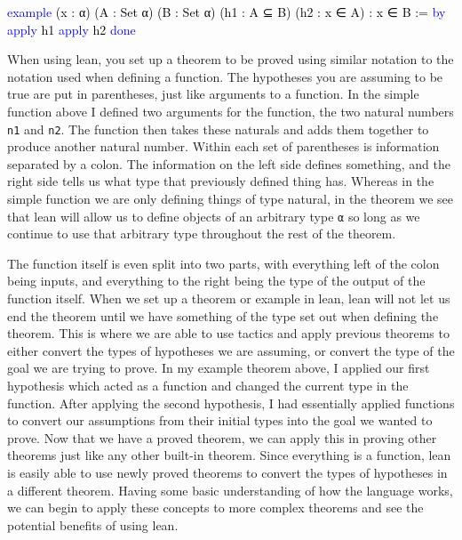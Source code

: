 \documentclass[
  letterpaper,
]{scrreprt}
\newenvironment{Shaded}{\begin{snugshade}}{\end{snugshade}}
\newcommand{\KeywordTok}[1]{\textcolor[rgb]{0.00,0.23,0.31}{#1}}
\newcommand{\NormalTok}[1]{\textcolor[rgb]{0.00,0.23,0.31}{#1}}
\renewcommand{\NormalTok}[1]{\textcolor[HTML]{000000}{#1}}
\renewcommand{\KeywordTok}[1]{\textcolor[HTML]{0000FF}{#1}}
\theoremstyle{remark}
\begin{document}
\begin{Shaded}
\begin{Highlighting}[]
\KeywordTok{example}\NormalTok{ (x : α) (A : Set α) (B : Set α) (h1 : A ⊆ B) }
\NormalTok{    (h2 : x ∈ A) : x ∈ B := }\KeywordTok{by}
  \KeywordTok{apply}\NormalTok{ h1}
  \KeywordTok{apply}\NormalTok{ h2}
  \KeywordTok{done}
\end{Highlighting}
\end{Shaded}

When using lean, you set up a theorem to be proved using similar
notation to the notation used when defining a function. The hypotheses
you are assuming to be true are put in parentheses, just like arguments
to a function. In the simple function above I defined two arguments for
the function, the two natural numbers \texttt{n1} and \texttt{n2}. The
function then takes these naturals and adds them together to produce
another natural number. Within each set of parentheses is information
separated by a colon. The information on the left side defines
something, and the right side tells us what type that previously defined
thing has. Whereas in the simple function we are only defining things of
type natural, in the theorem we see that lean will allow us to define
objects of an arbitrary type \texttt{α} so long as we continue to use
that arbitrary type throughout the rest of the theorem.

The function itself is even split into two parts, with everything left
of the colon being inputs, and everything to the right being the type of
the output of the function itself. When we set up a theorem or example
in lean, lean will not let us end the theorem until we have something of
the type set out when defining the theorem. This is where we are able to
use tactics and apply previous theorems to either convert the types of
hypotheses we are assuming, or convert the type of the goal we are
trying to prove. In my example theorem above, I applied our first
hypothesis which acted as a function and changed the current type in the
function. After applying the second hypothesis, I had essentially
applied functions to convert our assumptions from their initial types
into the goal we wanted to prove. Now that we have a proved theorem, we
can apply this in proving other theorems just like any other built-in
theorem. Since everything is a function, lean is easily able to use
newly proved theorems to convert the types of hypotheses in a different
theorem. Having some basic understanding of how the language works, we
can begin to apply these concepts to more complex theorems and see the
potential benefits of using lean.
\end{document}
